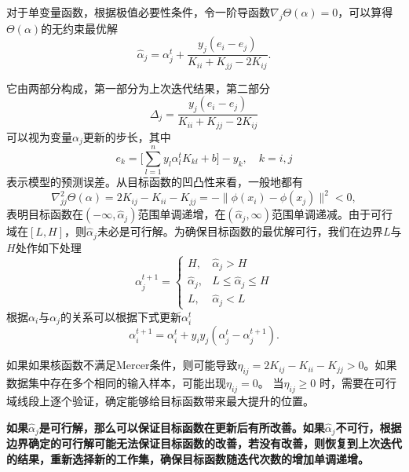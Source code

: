 \noindent 对于单变量函数，根据极值必要性条件，令一阶导函数$\nabla_j \Theta(\alpha) = 0$，可以算得$\Theta(\alpha)$的无约束最优解
\begin{equation}
    \hat\alpha_j = \alpha_j^t + \frac{y_j(e_i - e_j)}{K_{ii} + K_{jj} - 2 K_{ij}}.
\end{equation}

它由两部分构成，第一部分为上次迭代结果，第二部分
\begin{equation}\label{eq:updatestep}
    \Delta_j = \frac{y_j (e_i - e_j)}{K_{ii} + K_{jj} - 2 K_{ij}}
\end{equation}
可以视为变量$\alpha_j$更新的步长，其中
\begin{equation}
    e_k = \big[\sum\limits_{l=1}^n y_l \alpha_l^t K_{kl} + b\big] - y_k, \quad k = i, j
\end{equation}
表示模型的预测误差。从目标函数的凹凸性来看，一般地都有
\begin{equation}
    \nabla^2_{jj} \Theta(\alpha) = 2 K_{ij} - K_{ii} - K_{jj}  = -\|\phi(x_i) - \phi(x_j)\|^2 < 0,
\end{equation}
表明目标函数在$(-\infty, \hat\alpha_j)$范围单调递增，在$(\hat\alpha_j,\infty)$范围单调递减。由于可行域在$[L,H]$，则$\hat\alpha_j$未必是可行解。为确保目标函数的最优解可行，我们在边界$L$与$H$处作如下处理
\begin{equation}
    \alpha_j^{t+1} = \left\{
    \begin{array}{ll}
      H, & \hat\alpha_j  > H \\
      \hat\alpha_j,  & L \le \hat\alpha_j  \le H \\
      L, & \hat\alpha_j < L
    \end{array}
    \right.
\end{equation}
根据$\alpha_i$与$\alpha_j$的关系可以根据下式更新$\alpha_i^t$
\begin{equation}
    \alpha_i^{t+1} = \alpha_i^t + y_i y_j (\alpha_j^t - \alpha_j^{t+1}).
\end{equation}

如果如果核函数不满足Mercer条件，则可能导致$\eta_{ij} = 2K_{ij} - K_{ii} - K_{jj} >0$。如果数据集中存在多个相同的输入样本，可能出现$\eta_{ij}=0$。 当$\eta_{ij}\ge 0$ 时，需要在可行域线段上逐个验证，确定能够给目标函数带来最大提升的位置。

\textbf{如果$\hat\alpha_j$是可行解，那么可以保证目标函数在更新后有所改善。如果$\hat\alpha_j$不可行，根据边界确定的可行解可能无法保证目标函数的改善，若没有改善，则恢复到上次迭代的结果，重新选择新的工作集，确保目标函数随迭代次数的增加单调递增。}

